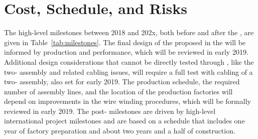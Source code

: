 \section{Cost, Schedule, and Risks}
\label{sec:fdsp-apa-cost-sched}



The high-level milestones between 2018 and 202x, both before and after the , are given in Table~\ref{tab:milestones}. The final design of the  proposed in the  will be informed by   production and performance, which will be reviewed in early 2019. Additional design considerations that cannot be directly tested through , like the two- assembly and related cabling issues, will require a full test with cabling of a two- assembly, also set for early 2019. The production schedule, the required number of assembly lines, and the location of the production factories will depend on improvements in the wire winding procedures, which will be formally reviewed in early 2019. The post- milestones are driven by high-level international project milestones and are based on a schedule that includes one year of factory preparation and about two years and a half of  construction.


